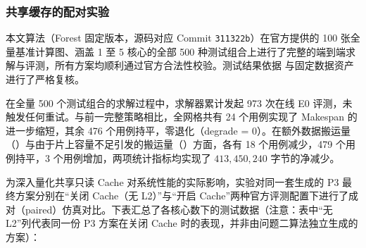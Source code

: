 \documentclass[anonymous,withtoc]{gmcm2026}
\begin{document}
\subsubsection{共享缓存的配对实验}

本文算法（Forest 固定版本，源码对应 Commit \texttt{311322b}）在官方提供的 100 张全量基准计算图、涵盖 1 至 5 核心的全部 500 种测试组合上进行了完整的端到端求解与评测，所有方案均顺利通过官方合法性校验。测试结果依据 \texttt{} 与固定数据资产进行了严格复核。

在全量 500 个测试组合的求解过程中，求解器累计发起 973 次在线 E0 评测，未触发任何重试。与前一完整策略相比，全网格共有 24 个用例实现了 Makespan 的进一步缩短，其余 476 个用例持平，零退化（degrade = 0）。在额外数据搬运量（\texttt{}）与由于片上容量不足引发的搬运量（\texttt{}）方面，各有 18 个用例减少，479 个用例持平，3 个用例增加，两项统计指标均实现了 \(413{,}450{,}240\) 字节的净减少。

为深入量化共享只读 Cache 对系统性能的实际影响，实验对同一套生成的 P3 最终方案分别在``关闭 Cache（无 L2）''与``开启 Cache''两种官方评测配置下进行了成对（paired）仿真对比。下表汇总了各核心数下的测试数据（注意：表中``无 L2''列代表同一份 P3 方案在关闭 Cache 时的表现，并非由问题二算法独立生成的方案）：
\end{document}

